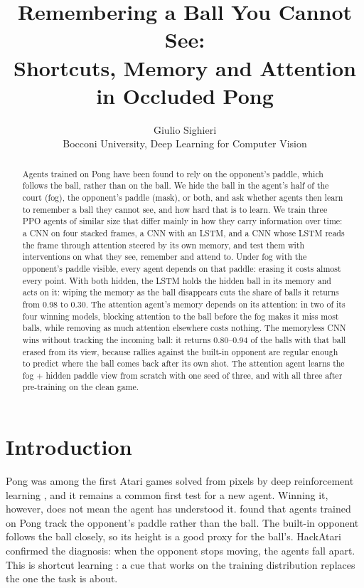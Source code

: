 \documentclass[11pt]{article}
\title{Remembering a Ball You Cannot See:\\Shortcuts, Memory and Attention in Occluded Pong}
\author{Giulio Sighieri\\\small Bocconi University, Deep Learning for Computer Vision}
\date{}
\begin{document}
\maketitle

\begin{abstract}
Agents trained on Pong have been found to rely on the opponent's paddle, which follows the ball, rather than
on the ball. We hide the ball in the agent's half of the court (fog), the opponent's paddle (mask), or both,
and ask whether agents then learn to remember a ball they cannot see, and how hard that is to learn. We train
three PPO agents of similar size that differ mainly in how they carry information over time: a CNN on four
stacked frames, a CNN with an LSTM, and a CNN whose LSTM reads the frame through attention steered by its own
memory, and test them with interventions on what they see, remember and attend to. Under fog with the
opponent's paddle visible, every agent depends on that paddle: erasing it costs almost every point. With
both hidden, the LSTM holds the hidden ball in its memory and acts on it: wiping the memory as the ball
disappears cuts the share of balls it returns from 0.98 to 0.30. The attention agent's memory depends on its
attention: in two of its four winning models, blocking attention to the ball before the fog makes it miss
most balls, while removing as much attention elsewhere costs nothing. The memoryless CNN wins without
tracking the incoming ball: it returns 0.80--0.94 of the balls with that ball erased from its view, because
rallies against the built-in opponent are regular enough to predict where the ball comes back after its own
shot. The attention agent learns the fog + hidden paddle view from scratch with one seed of three, and with
all three after pre-training on the clean game.
\end{abstract}

\section{Introduction}

Pong was among the first Atari games solved from pixels by deep reinforcement learning
\citep{mnih2013playing,mnih2015human}, and it remains a common first test for a new agent. Winning it,
however, does not mean the agent has understood it. \citet{delfosse2024scobots} found that agents trained on
Pong track the opponent's paddle rather than the ball. The built-in opponent follows the ball closely, so
its height is a good proxy for the ball's. HackAtari \citep{delfosse2024hackatari} confirmed the diagnosis:
when the opponent stops moving, the agents fall apart. This is shortcut learning \citep{geirhos2020shortcut}:
a cue that works on the training distribution replaces the one the task is about.
\end{document}
